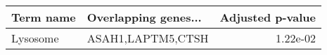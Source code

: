 \begin{tabular}{llr}
\toprule
Term name & Overlapping genes... &  Adjusted p-value \\
\midrule
 Lysosome &    ASAH1,LAPTM5,CTSH &          1.22e-02 \\
\bottomrule
\end{tabular}
